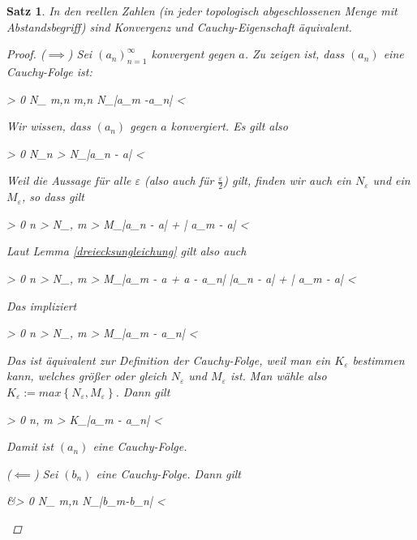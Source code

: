 \documentclass{article}
\newtheorem{thm}{Satz}[section]
\newenvironment{aleq*}{\begin{equation*}\begin{aligned}}{\end{aligned}\end{equation*}}
\begin{document}
	\begin{thm}
		In den reellen Zahlen (in jeder topologisch abgeschlossenen Menge mit Abstandsbegriff) sind Konvergenz und Cauchy-Eigenschaft äquivalent.
		
		\begin{proof}
			(\(\implies\)) Sei \((a_n)_{n=1}^\infty\) konvergent gegen \(a\). Zu zeigen ist, dass \((a_n)\) eine Cauchy-Folge ist:
			\begin{aleq*}
				\forall \varepsilon > 0 \colon \exists N_\varepsilon \in {} \colon \forall m,n \in {} \colon m,n \geq N_\varepsilon \implies |a_m -a_n| < \varepsilon
			\end{aleq*}
			\par
			Wir wissen, dass \((a_n)\) gegen \(a\) konvergiert. Es gilt also
			\begin{aleq*}
				\forall \varepsilon > 0 \colon \exists N_\varepsilon \colon \forall n > N_\varepsilon \colon |a_n - a| < \varepsilon \text{.}
			\end{aleq*}
			\par
			Weil die Aussage für alle \(\varepsilon\) (also auch für \(\frac{\varepsilon}{2}\)) gilt, finden wir auch ein \(N_\varepsilon\) und ein \(M_\varepsilon\), so dass gilt
			\begin{aleq*}
				\forall \varepsilon > 0 \colon \forall n > N_\varepsilon, m > M_\varepsilon \colon |a_n - a| + | a_m - a| < \varepsilon {}
			\end{aleq*}
			
			\par
			Laut Lemma \ref{dreiecksungleichung} gilt also auch
			\begin{aleq*}
				\forall \varepsilon > 0 \colon \forall n > N_\varepsilon, m > M_\varepsilon \colon |a_m - a + a - a_n| \leq |a_n - a| + | a_m - a| < \varepsilon \text{.}
			\end{aleq*}
			\par
			Das impliziert
			\begin{aleq*}
				\forall \varepsilon > 0 \colon \forall n > N_\varepsilon, m > M_\varepsilon \colon |a_m - a_n| < \varepsilon {}
			\end{aleq*}
			\par
			Das ist äquivalent zur Definition der Cauchy-Folge, weil man ein \(K_\varepsilon\) bestimmen kann, welches größer oder gleich \(N_\varepsilon\) und \(M_\varepsilon\) ist. Man wähle also \(K_\varepsilon := max \left\lbrace N_\varepsilon, M_\varepsilon\right\rbrace\). Dann gilt
			\begin{aleq*}
				\forall \varepsilon > 0 \colon \forall n, m > K_\varepsilon \colon |a_m - a_n| < \varepsilon \text{.}
			\end{aleq*}
			\par
			Damit ist \((a_n)\) eine Cauchy-Folge.
			\par
			(\(\impliedby\)) Sei \((b_n)\) eine Cauchy-Folge. Dann gilt
			\begin{aleq*}
				&\forall \varepsilon > 0 \colon \exists N_\varepsilon \in {} \colon \forall m,n \geq N_\varepsilon \colon |b_m-b_n| < \varepsilon {}
			\end{aleq*}
			

\end{proof}
\end{thm}
\end{document}
